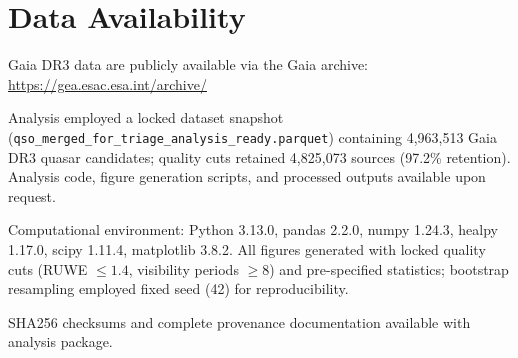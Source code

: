 \section*{Data Availability}

Gaia DR3 data are publicly available via the Gaia archive: \url{https://gea.esac.esa.int/archive/}

Analysis employed a locked dataset snapshot (\texttt{qso\_merged\_for\_triage\_analysis\_ready.parquet}) containing 4,963,513 Gaia DR3 quasar candidates; quality cuts retained 4,825,073 sources (97.2\% retention). Analysis code, figure generation scripts, and processed outputs available upon request.

Computational environment: Python 3.13.0, pandas 2.2.0, numpy 1.24.3, healpy 1.17.0, scipy 1.11.4, matplotlib 3.8.2. All figures generated with locked quality cuts (RUWE $\leq 1.4$, visibility periods $\geq 8$) and pre-specified statistics; bootstrap resampling employed fixed seed (42) for reproducibility.

SHA256 checksums and complete provenance documentation available with analysis package.

